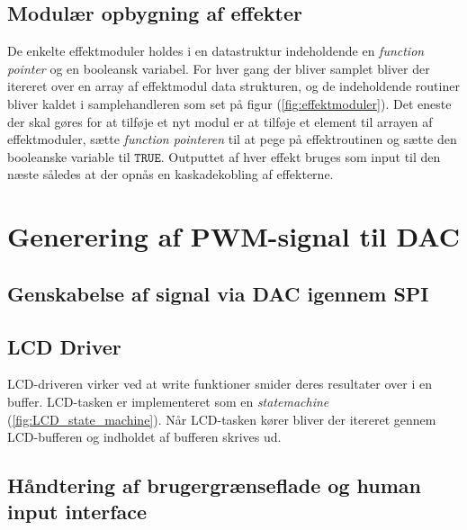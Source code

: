\subsection{Modulær opbygning af effekter}
De enkelte effektmoduler holdes i en datastruktur indeholdende en \textit{function pointer} og en booleansk variabel.
For hver gang der bliver samplet bliver der itereret over en array af effektmodul data strukturen, og de indeholdende routiner bliver kaldet i samplehandleren som set på figur (\ref{fig:effektmoduler}).\newline
Det eneste der skal gøres for at tilføje et nyt modul er at tilføje et element til arrayen af effektmoduler, sætte \textit{function pointeren} til at pege på effektroutinen og sætte den booleanske variable til $\mathtt{TRUE}$.
Outputtet af hver effekt bruges som input til den næste således at der opnås en kaskadekobling af effekterne.


\section{Generering af PWM-signal til DAC}


\subsection{Genskabelse af signal via DAC igennem SPI}


\subsection{LCD Driver}
LCD-driveren virker ved at write funktioner smider deres resultater over i en buffer.
LCD-tasken er implementeret som en \textit{statemachine} (\ref{fig:LCD_state_machine}).
Når LCD-tasken kører bliver der itereret gennem LCD-bufferen og indholdet af bufferen skrives ud.


\subsection{Håndtering af brugergrænseflade og human input interface}